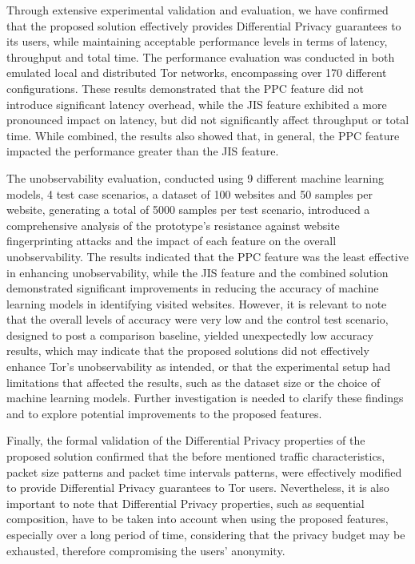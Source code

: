 Through extensive experimental validation and evaluation, we have confirmed that the proposed solution effectively provides Differential Privacy guarantees to its users, while maintaining acceptable performance levels in terms of latency, throughput and total time. The performance evaluation was conducted in both emulated local and distributed Tor networks, encompassing over 170 different configurations. These results demonstrated that the PPC feature did not introduce significant latency overhead, while the JIS feature exhibited a more pronounced impact on latency, but did not significantly affect throughput or total time. While combined, the results also showed that, in general, the PPC feature impacted the performance greater than the JIS feature. 

The unobservability evaluation, conducted using 9 different machine learning models, 4 test case scenarios, a dataset of 100 websites and 50 samples per website, generating a total of 5000 samples per test scenario, introduced a comprehensive analysis of the prototype's resistance against website fingerprinting attacks and the impact of each feature on the overall unobservability. The results indicated that the PPC feature was the least effective in enhancing unobservability, while the JIS feature and the combined solution demonstrated significant improvements in reducing the accuracy of machine learning models in identifying visited websites. However, it is relevant to note that the overall levels of accuracy were very low and the control test scenario, designed to post a comparison baseline, yielded unexpectedly low accuracy results, which may indicate that the proposed solutions did not effectively enhance Tor's unobservability as intended, or that the experimental setup had limitations that affected the results, such as the dataset size or the choice of machine learning models. Further investigation is needed to clarify these findings and to explore potential improvements to the proposed features. 

Finally, the formal validation of the Differential Privacy properties of the proposed solution confirmed that the before mentioned traffic characteristics, packet size patterns and packet time intervals patterns, were effectively modified to provide Differential Privacy guarantees to Tor users. Nevertheless, it is also important to note that Differential Privacy properties, such as sequential composition, have to be taken into account when using the proposed features, especially over a long period of time, considering that the privacy budget may be exhausted, therefore compromising the users' anonymity.


